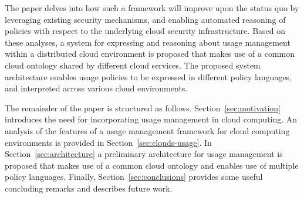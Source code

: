 \documentclass[10pt, conference, compsocconf]{IEEEtran}
\begin{document}
The paper delves into how such a framework will improve upon the status quo by leveraging  existing security mechanisms, and enabling automated reasoning of policies with respect to the underlying cloud security infrastructure. Based on these analyses, a system for expressing and reasoning about usage management within a distributed cloud environment is proposed that makes use of a common cloud ontology shared by different cloud services. The proposed system architecture enables usage policies to be expressed in different policy languages, and interpreted across various cloud environments. 

The remainder of the paper is structured as follows. Section~\ref{sec:motivation} introduces the need for incorporating usage management in cloud computing. An analysis of the features of a usage management framework for cloud computing environments is provided in Section~\ref{sec:clouds-usage}. In Section~\ref{sec:architecture} a preliminary architecture for usage management is proposed that makes use of a common cloud ontology and enables use of multiple policy languages. Finally, Section~\ref{sec:conclusions} provides some useful concluding remarks and describes future work. 



\end{document}
